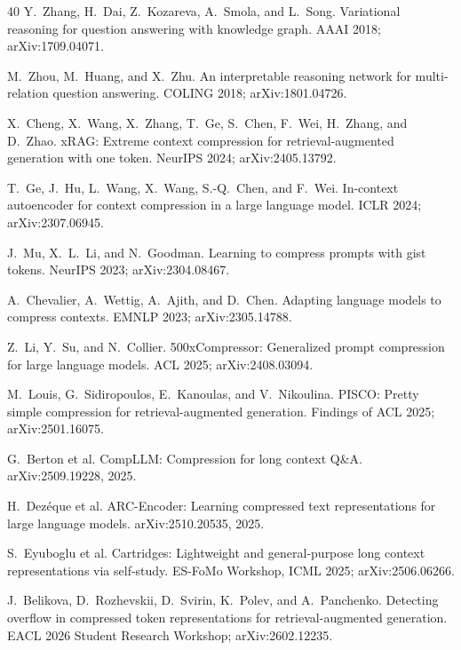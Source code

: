 \documentclass{article}
\begin{document}
\begin{thebibliography}{40}
 Y.~Zhang, H.~Dai, Z.~Kozareva, A.~Smola, and L.~Song.
\newblock Variational reasoning for question answering with knowledge graph.
\newblock AAAI 2018; arXiv:1709.04071.

 M.~Zhou, M.~Huang, and X.~Zhu.
\newblock An interpretable reasoning network for multi-relation question answering.
\newblock COLING 2018; arXiv:1801.04726.

 X.~Cheng, X.~Wang, X.~Zhang, T.~Ge, S.~Chen, F.~Wei, H.~Zhang, and D.~Zhao.
\newblock xRAG: Extreme context compression for retrieval-augmented generation with one token.
\newblock NeurIPS 2024; arXiv:2405.13792.

 T.~Ge, J.~Hu, L.~Wang, X.~Wang, S.-Q.~Chen, and F.~Wei.
\newblock In-context autoencoder for context compression in a large language model.
\newblock ICLR 2024; arXiv:2307.06945.

 J.~Mu, X.~L.~Li, and N.~Goodman.
\newblock Learning to compress prompts with gist tokens.
\newblock NeurIPS 2023; arXiv:2304.08467.

 A.~Chevalier, A.~Wettig, A.~Ajith, and D.~Chen.
\newblock Adapting language models to compress contexts.
\newblock EMNLP 2023; arXiv:2305.14788.

 Z.~Li, Y.~Su, and N.~Collier.
\newblock 500xCompressor: Generalized prompt compression for large language models.
\newblock ACL 2025; arXiv:2408.03094.

 M.~Louis, G.~Sidiropoulos, E.~Kanoulas, and V.~Nikoulina.
\newblock PISCO: Pretty simple compression for retrieval-augmented generation.
\newblock Findings of ACL 2025; arXiv:2501.16075.

 G.~Berton et al.
\newblock CompLLM: Compression for long context Q\&A.
\newblock arXiv:2509.19228, 2025.

 H.~Dez\'{e}que et al.
\newblock ARC-Encoder: Learning compressed text representations for large language models.
\newblock arXiv:2510.20535, 2025.

 S.~Eyuboglu et al.
\newblock Cartridges: Lightweight and general-purpose long context representations via
  self-study.
\newblock ES-FoMo Workshop, ICML 2025; arXiv:2506.06266.

 J.~Belikova, D.~Rozhevskii, D.~Svirin, K.~Polev, and A.~Panchenko.
\newblock Detecting overflow in compressed token representations for retrieval-augmented
  generation.
\newblock EACL 2026 Student Research Workshop; arXiv:2602.12235.


\end{thebibliography}
\end{document}
